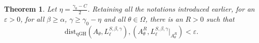 \documentclass[a4paper,11pt,reqno]{amsart}
\theoremstyle{plain}
\newtheorem{thm}{Theorem}[section]
\theoremstyle{mainthmstyle}
\theoremstyle{named}
\numberwithin{equation}{section}
\begin{document}
\begin{thm} \label{tail threshold}
Let $\eta=\frac{\gamma_0-C}{2}$. Retaining all the notations introduced earlier, for an $\varepsilon>0$, for all $\beta\ge\alpha$, $\gamma\ge\gamma_0 - \eta$ and all $\theta\in\Omega$, there is an $R>0$ such that
\begin{displaymath}
 \mathrm {dist}_{\mathrm {qGH}} \left ( A_{\theta}, L_{\ell}^{S, \beta, \gamma} \right ), \left (A_{\theta}^{R}, L_{\ell}^{S, \beta, \gamma} \big \rvert_{A_{\theta}^{R}} \right ) < \varepsilon.   
\end{displaymath}
\end{thm}
\end{document}
